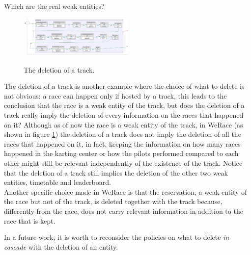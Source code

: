 \documentclass{beamer}
\newcommand{\kc}{WeRace}
\begin{document}
\begin{frame}{Which are the real weak entities?}
    \scriptsize
    \begin{figure}
        \centering
        \includegraphics[width=0.5\textwidth]{drawio/del-track.png}
        \label{fig:delete-track}
        \caption{The deletion of a track.}
    \end{figure}
    The deletion of a track is another example where the choice of what to delete is not obvious:
    a race can happen only if hosted by a track, this leads to the conclusion that the race is a weak entity 
    of the track, but does the deletion of a track really imply the deletion of every information on the races 
    that happened on it? Although as of now the race is a weak entity of the track, in \kc{} (as shown
    in figure \ref{fig:delete-track}) the deletion of a track does 
    not imply the deletion of all the races that happened on it, in fact, 
    keeping the information on how many races happened 
    in the karting center or how the pilots performed compared to each other
    might still be relevant independently of the existence of the track.
    Notice that the deletion of a track still implies the deletion of the other two weak entities, timetable and leaderboard.
    \hfill \\
    Another specific choice made in \kc{} is that the reservation, a weak entity of the race but not of the track, is deleted together 
    with the track because, differently from the race, does not carry relevant information in addition to the race that is kept.
    
    In a future work, it is worth to reconsider the policies on what to delete \textit{in cascade} with the deletion of an entity.
\end{frame}
\end{document}
